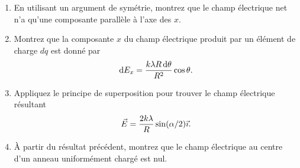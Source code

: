 \documentclass{tufte-handout}
\begin{document}
\begin{enumerate}
  \item En utilisant un argument de symétrie, montrez que le champ électrique
    net n'a qu'une composante parallèle à l'axe des $x$.
  \item Montrez que la composante $x$ du champ électrique produit par un
    élément de charge $dq$ est donné par
    \[
      \mathrm{d} E_x =  \frac{k\lambda R \,\mathrm{d} \theta}{R^2} \cos \theta.
    \]
  \item Appliquez le principe de superposition pour trouver le champ électrique
    résultant
    \[
      \vec{E} = \frac{2k\lambda}{R} \sin(\alpha / 2) \vec{\imath}.
    \]
  \item À partir du résultat précédent, montrez que le champ électrique au
    centre d'un anneau uniformément chargé est nul.
\end{enumerate}
\end{document}
